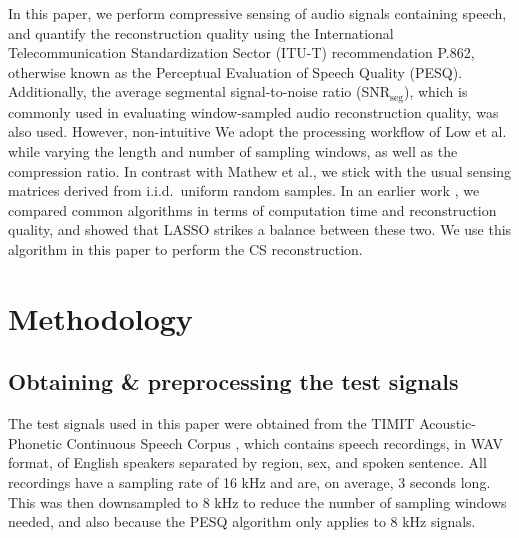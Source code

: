 \documentclass[10pt,a4paper,twoside]{article}
\newcommand{\snrseg}{SNR$_{\mathrm{seg}}$}
\begin{document}
In this paper, we perform compressive sensing of audio signals containing speech, and quantify the reconstruction quality using the International Telecommunication Standardization Sector (ITU-T) recommendation P.862, otherwise known as the Perceptual Evaluation of Speech Quality (PESQ).   Additionally, the average segmental signal-to-noise ratio (\snrseg), which is commonly used in evaluating window-sampled audio reconstruction quality, was also used. However,  non-intuitive   We adopt the processing workflow of Low et al. while varying the length and number of sampling windows, as well as the compression ratio. In contrast with Mathew et al., we stick with the usual sensing matrices derived from i.i.d.~uniform random samples. In an earlier work \cite{Domingo2019}, we compared common algorithms in terms of computation time and reconstruction quality, and showed that LASSO strikes a balance between these two. We use this algorithm in this paper to perform the CS reconstruction.


\section{Methodology}\label{sec:metho}

\subsection{Obtaining \& preprocessing the test signals}\label{ssec:timit}
The test signals used in this paper were obtained from the TIMIT Acoustic-Phonetic Continuous Speech Corpus \cite{timit}, which contains speech recordings, in WAV format, of English speakers separated by region, sex, and spoken sentence. All recordings have a sampling rate of 16 kHz and are, on average, 3 seconds long. This was then downsampled to 8 kHz to reduce the number of sampling windows needed, and also because the PESQ algorithm only applies to 8 kHz signals.
\end{document}
